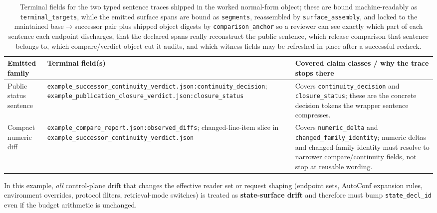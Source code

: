 \documentclass[11pt]{article}
\begin{document}
\begin{table}[t]
\centering
\small
\begin{tabularx}{\linewidth}{@{}Y Y Y@{}}
\toprule
Emitted family & Terminal field(s) & Covered claim classes / why the trace stops there \\
\midrule
Public status sentence & \texttt{example\_successor\_continuity\_verdict.json:continuity\_decision}; \texttt{example\_publication\_closure\_verdict.json:closure\_status} & Covers \texttt{continuity\_decision} and \texttt{closure\_status}; these are the concrete decision tokens the wrapper sentence compresses. \\
Compact numeric diff & \texttt{example\_compare\_report.json:observed\_diffs}; changed-line-item slice in \texttt{example\_successor\_continuity\_verdict.json} & Covers \texttt{numeric\_delta} and \texttt{changed\_family\_identity}; numeric deltas and changed-family identity must resolve to narrower compare/continuity fields, not stop at reusable wording. \\
\bottomrule
\end{tabularx}
\caption{Terminal fields for the two typed sentence traces shipped in the worked normal-form object; these are bound machine-readably as \texttt{terminal\_targets}, while the emitted surface spans are bound as \texttt{segments}, reassembled by \texttt{surface\_assembly}, and locked to the maintained base$\to$successor pair plus shipped object digests by \texttt{comparison\_anchor} so a reviewer can see exactly which part of each sentence each endpoint discharges, that the declared spans really reconstruct the public sentence, which release comparison that sentence belongs to, which compare/verdict object cut it audits, and which witness fields may be refreshed in place after a successful recheck.}
\label{tab:workedexample-trace-endpoints}
\end{table}

In this example, \emph{all} control-plane drift that changes the effective reader set or request shaping (endpoint sets, AutoConf expansion rules, environment overrides, protocol filters, retrieval-mode switches) is treated as \textbf{state-surface drift} and therefore must bump \texttt{state\_decl\_id} even if the budget arithmetic is unchanged.\cite{series:deployedsurfaces,series:planstateequiv}
\end{document}
